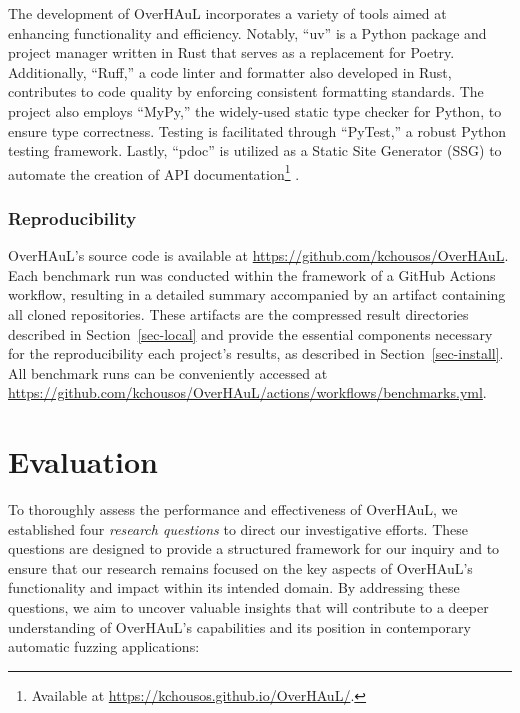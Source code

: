 \documentclass[
  a4paper,
]{scrreprt}
\theoremstyle{definition}
\theoremstyle{remark}
\begin{document}
The development of OverHAuL incorporates a variety of tools aimed at
enhancing functionality and efficiency. Notably, ``uv'' is a Python
package and project manager written in Rust that serves as a replacement
for Poetry. Additionally, ``Ruff,'' a code linter and formatter also
developed in Rust, contributes to code quality by enforcing consistent
formatting standards. The project also employs ``MyPy,'' the widely-used
static type checker for Python, to ensure type correctness. Testing is
facilitated through ``PyTest,'' a robust Python testing framework.
Lastly, ``pdoc'' is utilized as a Static Site Generator (SSG) to
automate the creation of API documentation\footnote{Available at
  \url{https://kchousos.github.io/OverHAuL/}.}
\autocite{astral2025,astral2025a,cortesi2025,pytestdevteam2025,pythonsoftwarefoundation2025}.

\subsection{Reproducibility}\label{reproducibility}

OverHAuL's source code is available at
\url{https://github.com/kchousos/OverHAuL}. Each benchmark run was
conducted within the framework of a GitHub Actions workflow, resulting
in a detailed summary accompanied by an artifact containing all cloned
repositories. These artifacts are the compressed result directories
described in Section~\ref{sec-local} and provide the essential
components necessary for the reproducibility each project's results, as
described in Section~\ref{sec-install}. All benchmark runs can be
conveniently accessed at
\url{https://github.com/kchousos/OverHAuL/actions/workflows/benchmarks.yml}.


\chapter{Evaluation}\label{sec-eval}

To thoroughly assess the performance and effectiveness of OverHAuL, we
established four \emph{research questions} to direct our investigative
efforts. These questions are designed to provide a structured framework
for our inquiry and to ensure that our research remains focused on the
key aspects of OverHAuL's functionality and impact within its intended
domain. By addressing these questions, we aim to uncover valuable
insights that will contribute to a deeper understanding of OverHAuL's
capabilities and its position in contemporary automatic fuzzing
applications:
\end{document}
